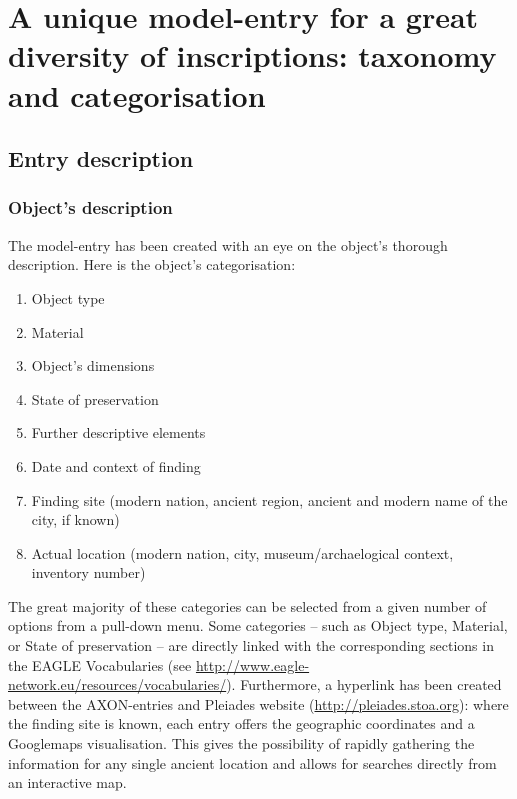 \documentclass[amsthm,ebook]{saparticle}
\begin{document}
\section{A unique model-entry for a great diversity of inscriptions: taxonomy and categorisation}





\subsection{Entry description}

\subsubsection{Object’s description}


\noindent The model-entry has been created with an eye on the object’s thorough description. Here is the object’s categorisation:

\begin{enumerate}
\renewcommand{\theenumi}{\alph{enumi}}
\item Object type
\item Material
\item Object’s dimensions
\item State of preservation
\item Further descriptive elements
\item Date and context of finding
\item Finding site (modern nation, ancient region, ancient and modern name of the city, if known)
\item Actual location (modern nation, city, museum/archaelogical context, inventory number)
\end{enumerate}
The great majority of these categories can be selected from a given number of options from a pull-down menu. Some
categories – such as Object type, Material, or State of preservation – are directly linked with the corresponding
sections in the EAGLE Vocabularies (see \url{http://www.eagle-network.eu/resources/vocabularies/}). Furthermore, a hyperlink
has been created between the AXON-entries and Pleiades website (\url{http://pleiades.stoa.org}): where the finding site is
known, each entry offers the geographic coordinates and a Googlemaps visualisation. This gives the possibility of
rapidly gathering the information for any single ancient location and allows for searches directly from an interactive
map.
\end{document}
